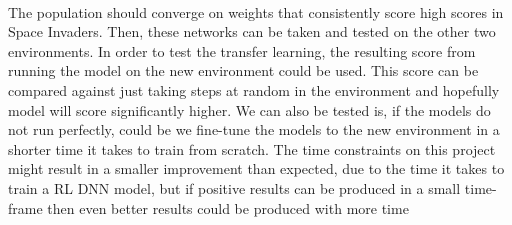 \paragraph{}

The population should converge on weights that consistently score high scores in Space Invaders. Then, these networks can be taken and tested on the other two environments. In order to test the transfer learning, the resulting score from running the model on the new environment could be used. This score can be compared against just taking steps at random in the environment and hopefully model will score significantly higher. We can also be tested is, if the models do not run perfectly, could be we fine-tune the models to the new environment in a shorter time it takes to train from scratch. The time constraints on this project might result in a smaller improvement than expected, due to the time it takes to train a RL DNN model, but if positive results can be produced in a small time-frame then even better results could be produced with more time
